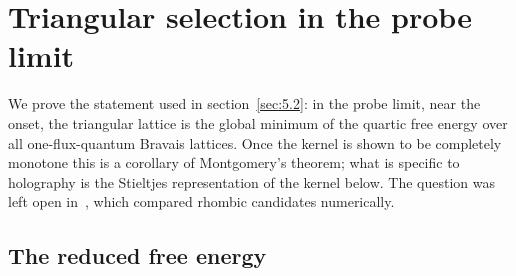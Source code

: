 \section{Triangular selection in the probe limit}
\label{app:probe}

We prove the statement used in section~\ref{sec:5.2}: in the probe limit,
near the onset, the triangular lattice is the global minimum of the quartic
free energy over all one-flux-quantum Bravais lattices. Once the kernel is
shown to be completely monotone this is a corollary of Montgomery's
theorem; what is specific to holography is the Stieltjes representation of
the kernel below. The question was left open
in~\cite{Bu:2012mq}, which compared rhombic candidates numerically.

\subsection{The reduced free energy}
\label{app:probe-free-energy}

